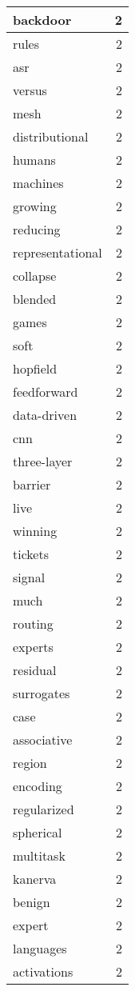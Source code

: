 \begin{table}[h]
\begin{tabular}{|l|r|}
backdoor & 2 \\
\hline
rules & 2 \\
\hline
asr & 2 \\
\hline
versus & 2 \\
\hline
mesh & 2 \\
\hline
distributional & 2 \\
\hline
humans & 2 \\
\hline
machines & 2 \\
\hline
growing & 2 \\
\hline
reducing & 2 \\
\hline
representational & 2 \\
\hline
collapse & 2 \\
\hline
blended & 2 \\
\hline
games & 2 \\
\hline
soft & 2 \\
\hline
hopfield & 2 \\
\hline
feedforward & 2 \\
\hline
data-driven & 2 \\
\hline
cnn & 2 \\
\hline
three-layer & 2 \\
\hline
barrier & 2 \\
\hline
live & 2 \\
\hline
winning & 2 \\
\hline
tickets & 2 \\
\hline
signal & 2 \\
\hline
much & 2 \\
\hline
routing & 2 \\
\hline
experts & 2 \\
\hline
residual & 2 \\
\hline
surrogates & 2 \\
\hline
case & 2 \\
\hline
associative & 2 \\
\hline
region & 2 \\
\hline
encoding & 2 \\
\hline
regularized & 2 \\
\hline
spherical & 2 \\
\hline
multitask & 2 \\
\hline
kanerva & 2 \\
\hline
benign & 2 \\
\hline
expert & 2 \\
\hline
languages & 2 \\
\hline
activations & 2 \\

\end{tabular}
\end{table}
